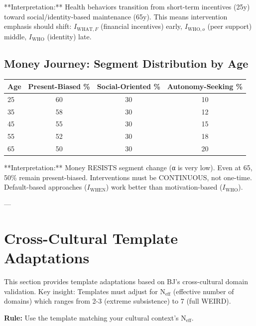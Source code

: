 **Interpretation:** Health behaviors transition from short-term incentives (25y) toward social/identity-based maintenance (65y). This means intervention emphasis should shift: $I_{\text{WHAT},F}$ (financial incentives) early, $I_{\text{WHO},o}$ (peer support) middle, $I_{\text{WHO}}$ (identity) late.

\subsection{Money Journey: Segment Distribution by Age}

\begin{center}
\begin{tabular}{@{}lccc@{}}
\toprule
\textbf{Age} & \textbf{Present-Biased \%} & \textbf{Social-Oriented \%} & \textbf{Autonomy-Seeking \%} \\
\midrule
25 & 60 & 30 & 10 \\
35 & 58 & 30 & 12 \\
45 & 55 & 30 & 15 \\
55 & 52 & 30 & 18 \\
65 & 50 & 30 & 20 \\
\midrule
\end{tabular}
\end{center}

**Interpretation:** Money RESISTS segment change (α is very low). Even at 65, 50\% remain present-biased. Interventions must be CONTINUOUS, not one-time. Default-based approaches ($I_{\text{WHEN}}$) work better than motivation-based ($I_{\text{WHO}}$).

---


\section{Cross-Cultural Template Adaptations}
\label{rrr:crosscultural}

\begin{tcolorbox}[colback=orange!5!white, colframe=orange!75!black, title=Connection to Appendix UNMAPPED_BJ]
This section provides template adaptations based on BJ's cross-cultural domain validation.
Key insight: Templates must adjust for N$_{\text{eff}}$ (effective number of domains) which
ranges from 2-3 (extreme subsistence) to 7 (full WEIRD).

\textbf{Rule:} Use the template matching your cultural context's N$_{\text{eff}}$.
\end{tcolorbox}

